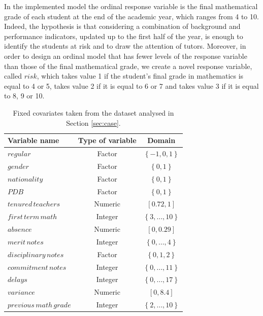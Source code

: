 In the implemented model the ordinal response variable is the final mathematical grade of each student at the end of the academic year, which ranges from 4 to 10.
Indeed, the hypothesis is that considering a combination of background and performance indicators, updated up to the first half of the year, is enough to identify the students at risk and to draw the attention of tutors.
Moreover, in order to design an ordinal model that has fewer levels of the response variable than those of the final mathematical grade, we create a novel response variable, called \(risk\), which takes value 1 if the student's final grade in mathematics is equal to 4 or 5,
takes value 2 if it is equal to 6 or 7 and  takes value 3 if it is equal to 8, 9 or 10.

\begin{table}[H]
    \centering 
    \begin{tabular}{|p{10em}|c|c|}
    \hline
    \rowcolor{bluePoli!40}
    \textbf{Variable name} & \textbf{Type of variable} & \textbf{Domain} \T\B \\
    \hline \hline
    \(regular\) &  Factor &  \(\left\{-1,0,1\right\}\) \T\B \\
    \hline
    \(gender\) &  Factor &  \(\left\{0,1\right\}\) \T\B \\
    \hline
    \(nationality\) &  Factor &  \(\left\{0,1\right\}\) \T\B \\
    \hline
    \(PDB\) &  Factor &  \(\left\{0,1\right\}\) \T\B \\
    \hline
    \(tenured \, teachers\) &  Numeric &  \([0.72,1]\) \T\B \\
    \hline
    \(first \, term \, math\) &  Integer &  \(\left\{3,\dots,10\right\}\) \T\B \\
    \hline
    \(absence\) &  Numeric &  \([0,0.29]\) \T\B \\
    \hline
    \(merit \, notes\) &  Integer &  \(\left\{0,\dots,4\right\}\) \T\B \\
    \hline
    \(disciplinary \, notes\) &  Factor & \(\left\{0,1,2\right\}\) \T\B \\
    \hline
    \(commitment \, notes\) &  Integer &  \(\left\{0,\dots,11\right\}\) \T\B \\
    \hline
    \(delays\) &  Integer &  \(\left\{0,\dots,17\right\}\) \T\B \\
    \hline
    \(variance\) &  Numeric &  \([0,8.4]\) \T\B \\
    \hline
    \(previous \, math \, grade\) &  Integer &  \(\left\{2,\dots,10\right\}\) \B \\
    \hline
    \end{tabular}
    \\[10pt]
    \caption{Fixed covariates taken from the dataset analysed in Section \ref{sec:case}.}
    \label{table:fix_var}
\end{table}


